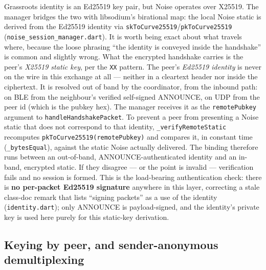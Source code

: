 \documentclass[11pt]{report}
\newcommand{\code}[1]{\texttt{\small #1}}
\begin{document}
Grassroots identity is an Ed25519 key pair, but Noise operates over X25519. The manager bridges the two with libsodium's birational map: the local Noise static is derived from the Ed25519 identity via \code{skToCurve25519}/\code{pkToCurve25519} (\code{noise\_session\_manager.dart}). It is worth being exact about what travels where, because the loose phrasing ``the identity is conveyed inside the handshake'' is common and slightly wrong. What the encrypted handshake carries is the peer's \emph{X25519 static key}, per the \code{XX} pattern. The peer's \emph{Ed25519 identity} is never on the wire in this exchange at all --- neither in a cleartext header nor inside the ciphertext. It is resolved out of band by the coordinator, from the inbound path: on BLE from the neighbour's verified self-signed ANNOUNCE, on UDP from the peer id (which is the pubkey hex). The manager receives it as the \code{remotePubkey} argument to \code{handleHandshakePacket}. To prevent a peer from presenting a Noise static that does not correspond to that identity, \code{\_verifyRemoteStatic} recomputes \code{pkToCurve25519(remotePubkey)} and compares it, in constant time (\code{\_bytesEqual}), against the static Noise actually delivered. The binding therefore runs between an out-of-band, ANNOUNCE-authenticated identity and an in-band, encrypted static. If they disagree --- or the point is invalid --- verification fails and no session is formed. This is the load-bearing authentication check: there is \textbf{no per-packet Ed25519 signature} anywhere in this layer, correcting a stale class-doc remark that lists ``signing packets'' as a use of the identity (\code{identity.dart}); only ANNOUNCE is payload-signed, and the identity's private key is used here purely for this static-key derivation.

\subsection*{Keying by peer, and sender-anonymous demultiplexing}
\end{document}
